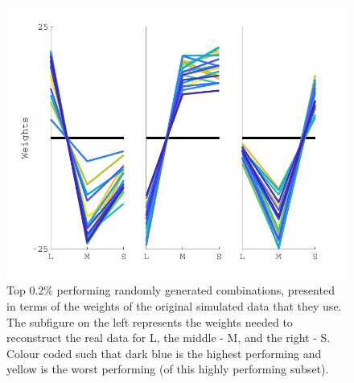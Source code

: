 \begin{figure}[htbp]
\includegraphics[max width=\textwidth]{figs/LargeSphere/contributions_3.pdf}
\caption{Top 0.2\% performing randomly generated combinations, presented in terms of the weights of the original simulated data that they use. The subfigure on the left represents the weights needed to reconstruct the real data for L, the middle - M, and the right - S. Colour coded such that dark blue is the highest performing and yellow is the worst performing (of this highly performing subset).}
\label{fig:contributions_3}
\end{figure}

